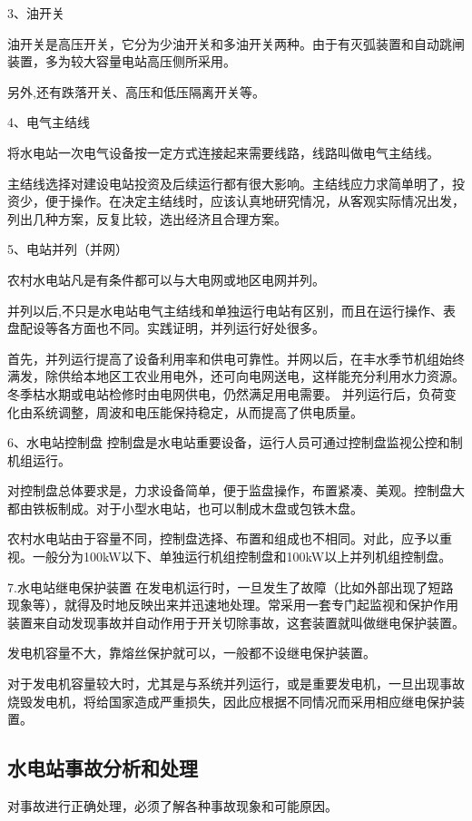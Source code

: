 \documentclass{ctexbook}
\begin{document}
3、油开关

油开关是高压开关，它分为少油开关和多油开关两种。由于有灭弧装置和自动跳闸装置，多为较大容量电站高压侧所采用。

另外,还有跌落开关、高压和低压隔离开关等。

4、电气主结线

将水电站一次电气设备按一定方式连接起来需要线路，线路叫做电气主结线。

主结线选择对建设电站投资及后续运行都有很大影响。主结线应力求简单明了，投资少，便于操作。在决定主结线时，应该认真地研究情况，从客观实际情况出发，列出几种方案，反复比较，选出经济且合理方案。

5、电站并列（并网）

农村水电站凡是有条件都可以与大电网或地区电网并列。

并列以后,不只是水电站电气主结线和单独运行电站有区别，而且在运行操作、表盘配设等各方面也不同。实践证明，并列运行好处很多。

首先，并列运行提高了设备利用率和供电可靠性。并网以后，在丰水季节机组始终满发，除供给本地区工农业用电外，还可向电网送电，这样能充分利用水力资源。冬季枯水期或电站检修时由电网供电，仍然满足用电需要。
并列运行后，负荷变化由系统调整，周波和电压能保持稳定，从而提高了供电质量。

6、水电站控制盘
控制盘是水电站重要设备，运行人员可通过控制盘监视公控和制机组运行。

对控制盘总体要求是，力求设备简单，便于监盘操作，布置紧凑、美观。控制盘大都由铁板制成。对于小型水电站，也可以制成木盘或包铁木盘。

农村水电站由于容量不同，控制盘选择、布置和组成也不相同。对此，应予以重视。一般分为100kW以下、单独运行机组控制盘和100kW以上并列机组控制盘。

7.水电站继电保护装置
在发电机运行时，一旦发生了故障（比如外部出现了短路现象等），就得及时地反映出来并迅速地处理。常采用一套专门起监视和保护作用装置来自动发现事故并自动作用于开关切除事故，这套装置就叫做继电保护装置。

发电机容量不大，靠熔丝保护就可以，一般都不设继电保护装置。

对于发电机容量较大时，尤其是与系统并列运行，或是重要发电机，一旦出现事故烧毁发电机，将给国家造成严重损失，因此应根据不同情况而采用相应继电保护装置。

\subsection{水电站事故分析和处理}
对事故进行正确处理，必须了解各种事故现象和可能原因。
\end{document}
